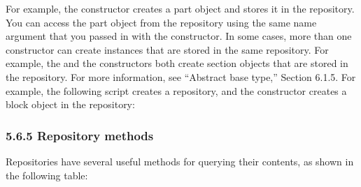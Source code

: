\documentclass[letterpaper,10pt,english]{sphinxmanual}
\begin{document}
For example, the  constructor creates a part object and stores it in the  repository. You can access the part object from the repository using the same name argument that you passed in with the  constructor. In some cases, more than one constructor can create instances that are stored in the same repository. For example, the  and the  constructors both create section objects that are stored in the  repository. For more information, see “Abstract base type,” Section 6.1.5. For example, the following script creates a  repository, and the  constructor creates a block object in the  repository:

\begin{sphinxVerbatim}[commandchars=\\\{\},numbers=left,firstnumber=1,stepnumber=1]
   
 
    

 
  
 \PYG{p}{[}\PYG{p}{]} 
\end{sphinxVerbatim}


\subsubsection{5.6.5 Repository methods}
\label{\detokenize{abq_script_guide:repository-methods}}
Repositories have several useful methods for querying their contents, as shown in the following table:
\end{document}
